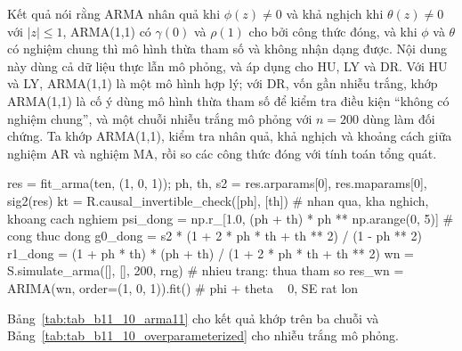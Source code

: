  Kết quả  nói rằng ARMA nhân quả khi $\phi(z)\ne0$ và khả nghịch khi $\theta(z)\ne0$ với $|z|\le1$, ARMA(1,1) có $\gamma(0)$ và $\rho(1)$ cho bởi công thức đóng, và khi $\phi$ và $\theta$ có nghiệm chung thì mô hình thừa tham số và không nhận dạng được.
 Nội dung này dùng cả dữ liệu thực lẫn mô phỏng, và áp dụng cho HU, LY và DR. Với HU và LY, ARMA(1,1) là một mô hình hợp lý; với DR, vốn gần nhiễu trắng, khớp ARMA(1,1) là cố ý dùng mô hình thừa tham số để kiểm tra điều kiện ``không có nghiệm chung'', và một chuỗi nhiễu trắng mô phỏng với $n=200$ dùng làm đối chứng. Ta khớp ARMA(1,1), kiểm tra nhân quả, khả nghịch và khoảng cách giữa nghiệm AR và nghiệm MA, rồi so các công thức đóng với tính toán tổng quát.
\begin{codeblock}
res = fit_arma(ten, (1, 0, 1)); ph, th, s2 = res.arparams[0], res.maparams[0], sig2(res)
kt = R.causal_invertible_check([ph], [th])   # nhan qua, kha nghich, khoang cach nghiem
psi_dong = np.r_[1.0, (ph + th) * ph ** np.arange(0, 5)]       # cong thuc dong
g0_dong = s2 * (1 + 2 * ph * th + th ** 2) / (1 - ph ** 2)
r1_dong = (1 + ph * th) * (ph + th) / (1 + 2 * ph * th + th ** 2)
wn = S.simulate_arma([], [], 200, rng)                          # nhieu trang: thua tham so
res_wn = ARIMA(wn, order=(1, 0, 1)).fit()                       # phi + theta ~ 0, SE rat lon
\end{codeblock}
 Bảng~\ref{tab:tab_b11_10_arma11} cho kết quả khớp trên ba chuỗi và Bảng~\ref{tab:tab_b11_10_overparameterized} cho nhiễu trắng mô phỏng.
